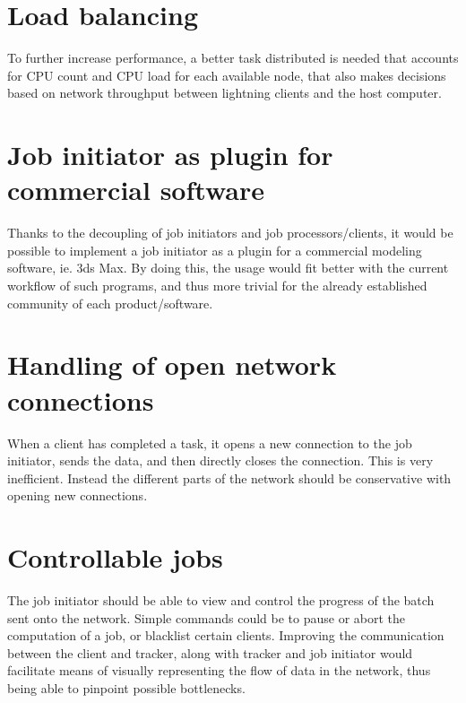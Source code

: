 \section{Load balancing}
To further increase performance, a better task distributed is needed that 
accounts for CPU count and CPU load for each available node, that also makes
decisions based on network throughput between lightning clients and the host
computer.

\section{Job initiator as plugin for commercial software}
Thanks to the decoupling of job initiators and job processors/clients, it
would be possible to implement a job initiator as a plugin for a commercial
modeling software, ie. 3ds Max. By doing this, the usage would fit better
with the current workflow of such programs, and thus more trivial for the
already established community of each product/software.

\section{Handling of open network connections}
When a client has completed a task, it opens a new connection to the job
initiator, sends the data, and then directly closes the connection.
This is very inefficient. Instead the different parts of the network should
be conservative with opening new connections.

\section{Controllable jobs}
The job initiator should be able to view and control the progress of the batch
sent onto the network. Simple commands could be to pause or abort the
computation of a job, or blacklist certain clients. Improving the communication
between the client and tracker, along with tracker and job initiator would
facilitate means of visually representing the flow of data in the network, thus
being able to pinpoint possible bottlenecks.


